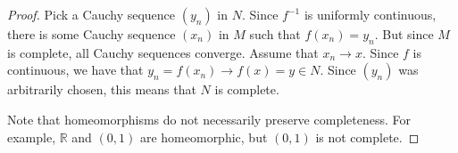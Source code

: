 \begin{proof}

Pick a Cauchy sequence $(y_n)$ in $N$. Since $f^{-1}$ is uniformly continuous, there is some Cauchy sequence $(x_n)$ in $M$ such that $f(x_n) = y_n$. But since $M$ is complete, all Cauchy sequences converge. Assume that $x_n \rightarrow x$. Since $f$ is continuous, we have that $y_n = f(x_n) \rightarrow f(x) = y \in N$. Since $(y_n)$ was arbitrarily chosen, this means that $N$ is complete.

Note that homeomorphisms do not necessarily preserve completeness. For example, $\mathbb{R}$ and $(0,1)$ are homeomorphic, but $(0,1)$ is not complete.
\end{proof}

